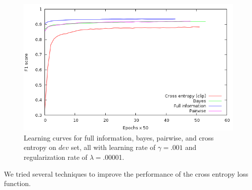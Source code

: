 \documentclass{article}
\begin{document}
\begin{figure}[h]
\centering
\includegraphics[scale=.35]{output}
\caption{Learning curves for full information, bayes, pairwise, and cross entropy on $dev$ set, all with learning rate of $\gamma=.001$ and regularization rate of $\lambda=.0000$1.}
\end{figure}

We tried several techniques to improve the performance of the cross entropy loss function. 
\end{document}
